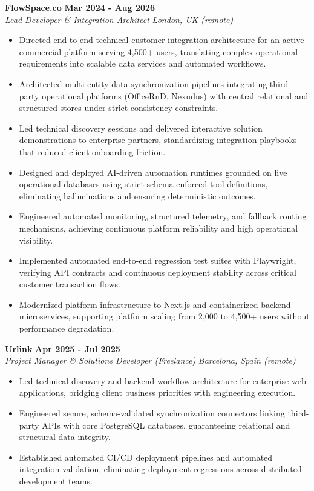 \documentclass[10pt,a4paper]{article}
\newcommand{\role}[4]{%
  \textbf{#1} \hfill \textbf{#2}\\[1pt]%
  \textit{#3} \hfill \textit{#4}\\[2pt]%
}
\begin{document}
\role{\href{https://flowspace.co}{FlowSpace.co}}{Mar 2024 - Aug 2026}{Lead Developer \& Integration Architect}{London, UK (remote)}
\begin{itemize}
  \item Directed end-to-end technical customer integration architecture for an active commercial platform serving 4,500+ users, translating complex operational requirements into scalable data services and automated workflows.
  \item Architected multi-entity data synchronization pipelines integrating third-party operational platforms (OfficeRnD, Nexudus) with central relational and structured stores under strict consistency constraints.
  \item Led technical discovery sessions and delivered interactive solution demonstrations to enterprise partners, standardizing integration playbooks that reduced client onboarding friction.
  \item Designed and deployed AI-driven automation runtimes grounded on live operational databases using strict schema-enforced tool definitions, eliminating hallucinations and ensuring deterministic outcomes.
  \item Engineered automated monitoring, structured telemetry, and fallback routing mechanisms, achieving continuous platform reliability and high operational visibility.
  \item Implemented automated end-to-end regression test suites with Playwright, verifying API contracts and continuous deployment stability across critical customer transaction flows.
  \item Modernized platform infrastructure to Next.js and containerized backend microservices, supporting platform scaling from 2,000 to 4,500+ users without performance degradation.
\end{itemize}

\role{Urlink}{Apr 2025 - Jul 2025}{Project Manager \& Solutions Developer (Freelance)}{Barcelona, Spain (remote)}
\begin{itemize}
  \item Led technical discovery and backend workflow architecture for enterprise web applications, bridging client business priorities with engineering execution.
  \item Engineered secure, schema-validated synchronization connectors linking third-party APIs with core PostgreSQL databases, guaranteeing relational and structural data integrity.
  \item Established automated CI/CD deployment pipelines and automated integration validation, eliminating deployment regressions across distributed development teams.
\end{itemize}
\end{document}
